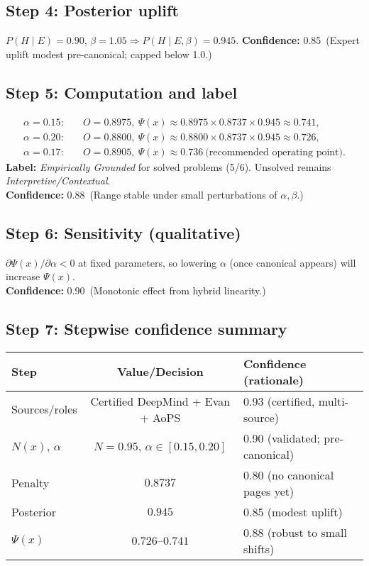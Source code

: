 \documentclass[11pt]{article}
\newcommand{\Px}{\Psi(x)}
\newcommand{\post}{P(H\mid E,\beta)}
\newcommand{\conf}[2]{\textbf{Confidence:} #1\ (#2)}
\begin{document}
\subsection*{Step 4: Posterior uplift}
$P(H\mid E)=0.90$, $\beta=1.05\Rightarrow \post=0.945$.
\conf{0.85}{Expert uplift modest pre-canonical; capped below 1.0.}

\subsection*{Step 5: Computation and label}
\begin{align*}
\alpha=0.15:&\quad O=0.8975,\ \Px \approx 0.8975\times 0.8737\times 0.945 \approx 0.741,\\
\alpha=0.20:&\quad O=0.8800,\ \Px \approx 0.8800\times 0.8737\times 0.945 \approx 0.726,\\
\alpha=0.17:&\quad O=0.8905,\ \Px \approx 0.736\ \text{(recommended operating point).}
\end{align*}
\textbf{Label:} \emph{Empirically Grounded} for solved problems (5/6). Unsolved remains \emph{Interpretive/Contextual}.\\
\conf{0.88}{Range stable under small perturbations of $\alpha,\beta$.}

\subsection*{Step 6: Sensitivity (qualitative)}
$\partial \Px/\partial \alpha < 0$ at fixed parameters, so lowering $\alpha$ (once canonical appears) will increase $\Px$.\\
\conf{0.90}{Monotonic effect from hybrid linearity.}

\subsection*{Step 7: Stepwise confidence summary}
\begin{center}
\renewcommand{\arraystretch}{1.15}
\begin{tabular}{@{}lcl@{}}
\toprule
Step & Value/Decision & Confidence (rationale)\\
\midrule
Sources/roles & Certified DeepMind + Evan + AoPS & 0.93 (certified, multi-source)\\
$N(x)$, $\alpha$ & $N=0.95$, $\alpha\in[0.15,0.20]$ & 0.90 (validated; pre-canonical)\\
Penalty & $0.8737$ & 0.80 (no canonical pages yet)\\
Posterior & $0.945$ & 0.85 (modest uplift)\\
$\Px$ & $0.726$--$0.741$ & 0.88 (robust to small shifts)\\
\bottomrule
\end{tabular}
\end{center}
\end{document}
